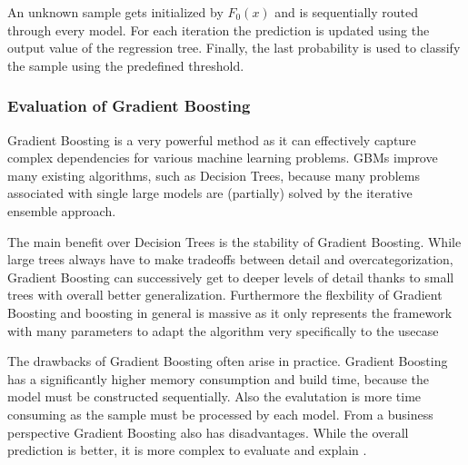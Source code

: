 An unknown sample gets initialized by \(F_{0}(x)\) and is sequentially routed through every model. For each iteration the 
prediction is updated using the output value of the regression tree. Finally, the last probability is used to classify 
the sample using the predefined threshold. 

\subsubsection{Evaluation of Gradient Boosting}

Gradient Boosting is a very powerful method as it can effectively capture complex dependencies for various machine 
learning problems. \ac{GBM}s improve many existing algorithms, such as Decision Trees, because many problems associated 
with single large models are (partially) solved by the iterative ensemble approach.

The main benefit over Decision Trees is the stability of Gradient Boosting. While large trees always have to make tradeoffs 
between detail and overcategorization, Gradient Boosting can successively get to deeper levels of detail thanks to 
small trees with overall better generalization. Furthermore the flexbility of Gradient Boosting and boosting in general is massive 
as it only represents the framework with many parameters to adapt the algorithm very specifically to the usecase \cite[7.2]{Natekin2013}

The drawbacks of Gradient Boosting often arise in practice. Gradient Boosting has a significantly higher memory consumption and 
build time, because the model must be constructed sequentially. Also the evalutation is more time consuming as the sample must be processed 
by each model. From a business perspective Gradient Boosting also has disadvantages. While the overall prediction is better, it is
more complex to evaluate and explain \cite[7.2]{Natekin2013} \cite[p.27]{Buhlmann2004Bagging}. 